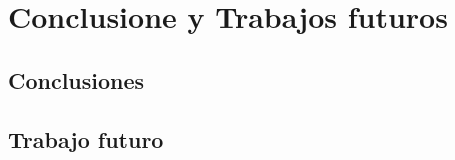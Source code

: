 \chapter{Conclusione y Trabajos futuros}
\label{ch:conclusiones}

\section{Conclusiones}

\section{Trabajo futuro}
